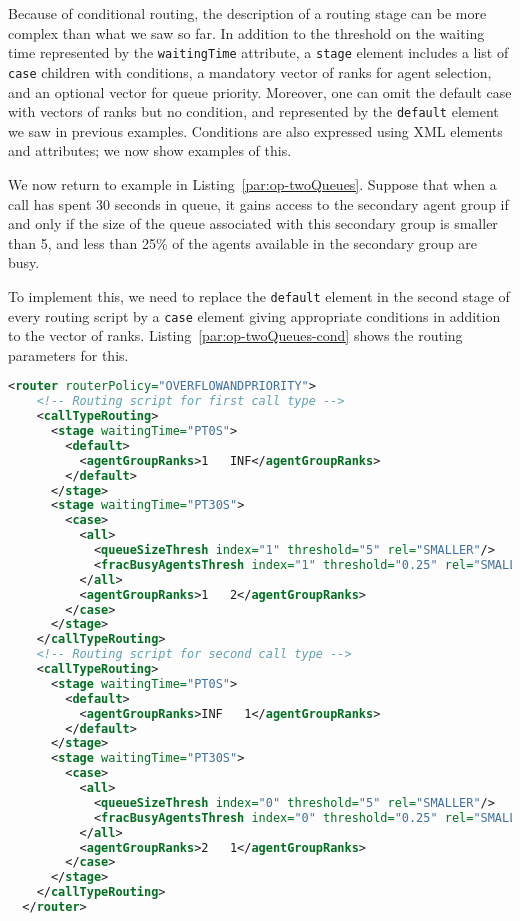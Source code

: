Because of conditional routing, the description of a routing stage can
be more complex than what we saw so far.
In addition to the threshold on the waiting time represented by the
\texttt{waiting\-Time} attribute, a \texttt{stage} element
includes
a list of \texttt{case} children with conditions, a mandatory vector
of ranks for agent selection, and an optional vector for queue priority.
Moreover, one can omit the
default case with vectors of ranks but no condition,
and represented by the \texttt{default} element we saw in
previous examples.
Conditions are also expressed using XML elements and attributes; we
now show examples of this.

We now return to example in Listing~\ref{par:op-twoQueues}.
Suppose that when a call has spent 30 seconds in queue, it gains
access to the secondary agent group if and only if
the size of the queue associated with this secondary group is smaller
than 5, and less than 25\% of the agents available in the secondary
group are busy.

To implement this, we need to replace the \texttt{default} element in
the second stage of every routing script by a \texttt{case} element
giving appropriate conditions in addition to the vector of ranks.
Listing~\ref{par:op-twoQueues-cond} shows the routing parameters for this.

\begin{lstlisting}[caption={Part of \texttt{op-twoQueues-cond.xml}:
    example of parameters for conditional routing},
language=XML, label=par:op-twoQueues-cond]
  <router routerPolicy="OVERFLOWANDPRIORITY">
    <!-- Routing script for first call type -->
    <callTypeRouting>
      <stage waitingTime="PT0S">
        <default>
          <agentGroupRanks>1   INF</agentGroupRanks>
        </default>
      </stage>
      <stage waitingTime="PT30S">
        <case>
          <all>
            <queueSizeThresh index="1" threshold="5" rel="SMALLER"/>
            <fracBusyAgentsThresh index="1" threshold="0.25" rel="SMALLER"/>
          </all>
          <agentGroupRanks>1   2</agentGroupRanks>
        </case>
      </stage>
    </callTypeRouting>
    <!-- Routing script for second call type -->
    <callTypeRouting>
      <stage waitingTime="PT0S">
        <default>
          <agentGroupRanks>INF   1</agentGroupRanks>
        </default>
      </stage>
      <stage waitingTime="PT30S">
        <case>
          <all>
            <queueSizeThresh index="0" threshold="5" rel="SMALLER"/>
            <fracBusyAgentsThresh index="0" threshold="0.25" rel="SMALLER"/>
          </all>
          <agentGroupRanks>2   1</agentGroupRanks>
        </case>
      </stage>
    </callTypeRouting>
  </router>
\end{lstlisting}

